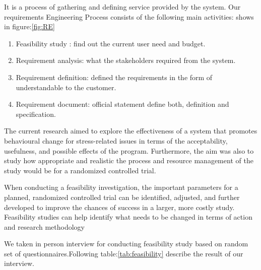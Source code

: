 It is a process of gathering and defining service provided by the system. Our requirements Engineering Process consists of the following main activities: shows in figure:\ref{fig:RE}

\begin{enumerate}
    \item  Feasibility study : find out the current user need and budget.
    \item Requirement analysis: what the stakeholders required from the system.
    \item Requirement definition: defined the requirements in the form of understandable to the customer.
    \item Requirement document: official statement define both, definition and specification.
\end{enumerate}

The current research aimed to explore the effectiveness of a system that promotes behavioural change for stress-related issues in terms of the acceptability, usefulness, and possible effects of the program. Furthermore, the aim was also to study how appropriate and realistic the process and resource management of the study would be for a randomized controlled trial. \citep{Eklund2018EvaluationStudy}

When conducting a feasibility investigation, the important parameters for a planned, randomized controlled trial can be identified, adjusted, and further developed to improve the chances of success in a larger, more costly study. Feasibility studies can help identify what needs to be changed in terms of action and research methodology

We taken in person interview for conducting feasibility study based on random set of questionnaires.Following table:\ref{tab:feasibility} describe the result of our interview. 

